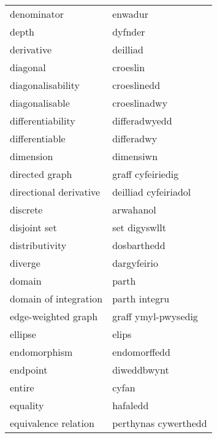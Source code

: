 \begin{supertabular}{p{0.22\textwidth}p{0.22\textwidth}}
                      denominator &                          enwadur \\
                            depth &                          dyfnder \\
                       derivative &                         deilliad \\
                         diagonal &                         croeslin \\
                diagonalisability &                      croeslinedd \\
                   diagonalisable &                     croeslinadwy \\
                differentiability &                    differadwyedd \\
                   differentiable &                       differadwy \\
                        dimension &                        dimensiwn \\
                   directed graph &                graff cyfeiriedig \\
           directional derivative &             deilliad cyfeiriadol \\
                         discrete &                        arwahanol \\
                     disjoint set &                    set digyswllt \\
                   distributivity &                      dosbarthedd \\
                          diverge &                      dargyfeirio \\
                           domain &                            parth \\
            domain of integration &                    parth integru \\
              edge-weighted graph &              graff ymyl-pwysedig \\
                          ellipse &                            elips \\
                     endomorphism &                     endomorffedd \\
                         endpoint &                      diweddbwynt \\
                           entire &                            cyfan \\
                         equality &                         hafaledd \\
             equivalence relation &             perthynas cywerthedd \\

\end{supertabular}

